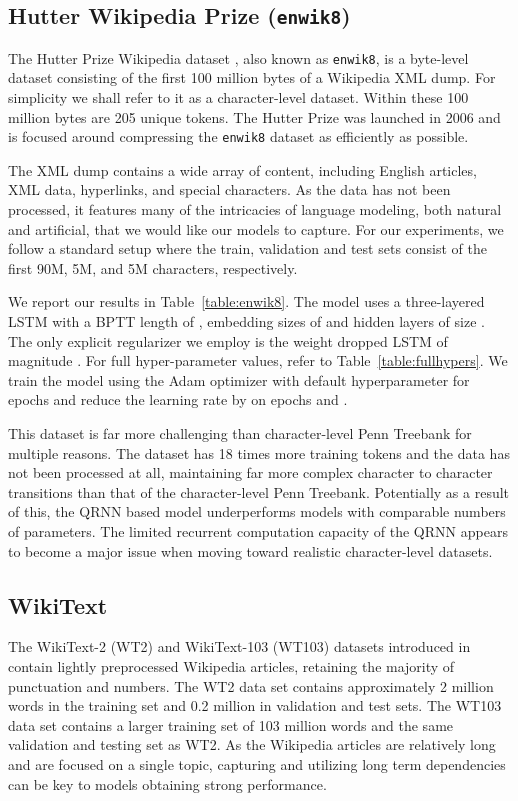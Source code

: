 \documentclass{article}
\newcommand{\enwik}{\texttt{enwik8}\xspace}
\begin{document}
\subsection{Hutter Wikipedia Prize (\enwik)}

The Hutter Prize Wikipedia dataset \cite{hutter}, also known as \enwik, is a byte-level dataset consisting of the first 100 million bytes of a Wikipedia XML dump.
For simplicity we shall refer to it as a character-level dataset.
Within these 100 million bytes are 205 unique tokens.
The Hutter Prize was launched in 2006 and is focused around compressing the \enwik dataset as efficiently as possible.

The XML dump contains a wide array of content, including English articles, XML data, hyperlinks, and special characters.
As the data has not been processed, it features many of the intricacies of language modeling, both natural and artificial, that we would like our models to capture.
For our experiments, we follow a standard setup where the train, validation and test sets consist of the first 90M, 5M, and 5M characters, respectively.

We report our results in Table~\ref{table:enwik8}.
The model uses a three-layered LSTM with a BPTT length of , embedding sizes of  and hidden layers of size .
The only explicit regularizer we employ is the weight dropped LSTM \cite{merity2018regularizing} of magnitude .
For full hyper-parameter values, refer to Table~\ref{table:fullhypers}.
We train the model using the Adam \cite{kingma2014adam} optimizer with default hyperparameter for  epochs and reduce the learning rate by  on epochs  and .

This dataset is far more challenging than character-level Penn Treebank for multiple reasons.
The dataset has 18 times more training tokens and the data has not been processed at all, maintaining far more complex character to character transitions than that of the character-level Penn Treebank.
Potentially as a result of this, the QRNN based model underperforms models with comparable numbers of parameters.
The limited recurrent computation capacity of the QRNN appears to become a major issue when moving toward realistic character-level datasets.

\subsection{WikiText}
The WikiText-2 (WT2) and WikiText-103 (WT103) datasets introduced in \citet{Merity2016} contain lightly preprocessed Wikipedia articles, retaining the majority of punctuation and numbers.
The WT2 data set contains approximately 2 million words in the training set and 0.2 million in validation and test sets.
The WT103 data set contains a larger training set of 103 million words and the same validation and testing set as WT2.
As the Wikipedia articles are relatively long and are focused on a single topic, capturing and utilizing long term dependencies can be key to models obtaining strong performance. 
\end{document}

